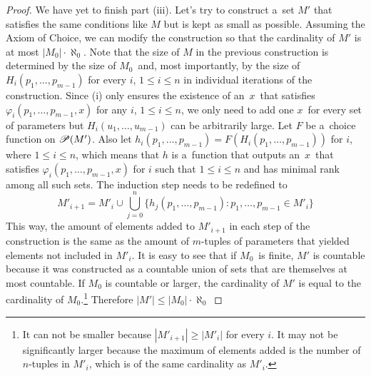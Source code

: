 \begin{proof}
We have yet to finish part (iii).
Let's try to construct a~set $M'$ that satisfies the same conditions like $M$ but is kept as small as possible. Assuming the Axiom of Choice, we can modify the construction so that the cardinality of $M'$ is at most $|M_0| \cdot \aleph_0$. Note that the size of $M$ in the previous construction is determined by the size of $M_0$ and, most importantly, by the size of $H_i(p_1, \ldots, p_{m-1})$ for every $i$, $1 \leq i \leq n$ in individual iterations of the construction. Since (i) only ensures the existence of an~$x$~that satisfies $\varphi_i(p_1, \ldots, p_{m-1}, x)$ for any $i$, $1 \leq i \leq n$, we only need to add one $x$ for every set of parameters but $H_i(u_1, \dots, u_{m-1})$ can be arbitrarily large. Let $F$ be a~choice function on $\mathscr{P} (M')$. Also let $h_i(p_1, \ldots, p_{m-1}) = F(H_i(p_1, \ldots, p_{m-1}))$ for $i$, where $1 \leq i \leq n$, which means that $h$ is a~function that outputs an~$x$~that satisfies $\varphi_i(p_1, \ldots, p_{m-1}, x)$ for $i$ such that $1 \leq i \leq n$ and has minimal rank among all such sets. The induction step needs to be redefined to
\begin{equation}
M'_{i+1} = M'_i \cup \bigcup_{j=0}^n \{ h_j(p_1, \ldots, p_{m-1}): p_1, \ldots, p_{m-1} \in M'_i \}
\end{equation}
This way, the amount of elements added to $M'_{i+1}$ in each step of the construction is the same as the amount of $m$-tuples of parameters that yielded elements not included in $M'_i$. It is easy to see that if $M_0$ is finite, $M'$ is countable because it was constructed as a countable union of sets that are themselves at most countable. If $M_0$ is countable or larger, the cardinality of $M'$ is equal to the cardinality of $M_0$.\footnote{It can not be smaller because $|M'_{i+1}| \geq |M'_i|$ for every $i$. It may not be significantly larger because the maximum of elements added is the number of $n$-tuples in $M'_i$, which is of the same cardinality as $M'_i$.}
Therefore $|M'| \leq |M_0| \cdot \aleph_0$
\end{proof}

